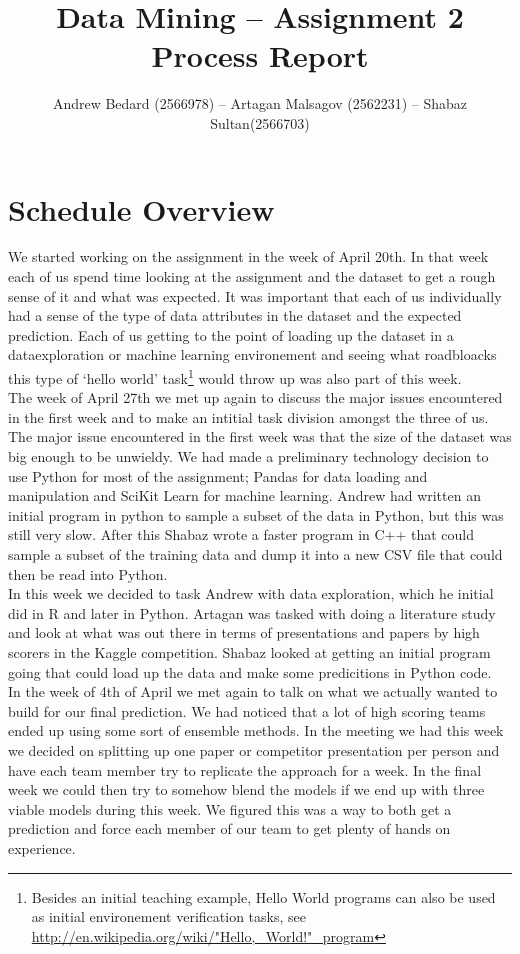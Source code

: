 \documentclass{llncs}
\title{Data Mining -- Assignment 2 Process Report}
\author{Andrew Bedard (2566978) -- Artagan Malsagov (2562231)  -- Shabaz Sultan(2566703)}
\institute{}
\begin{document}
\maketitle
\section{Schedule Overview}
We started working on the assignment in the week of April 20th. In that week each of us spend time looking at the assignment and the dataset to get a rough sense of it and what was expected. It was important that each of us individually had a sense of the type of data attributes in the dataset and the expected prediction. Each of us getting to the point of loading up the dataset in a dataexploration or machine learning environement and seeing what roadbloacks this type of `hello world' task\footnote{Besides an initial teaching example, Hello World programs can also be used as initial environement verification tasks, see \url{http://en.wikipedia.org/wiki/"Hello,_World!"_program}} would throw up was also part of this week.\\
The week of April 27th we met up again to discuss the major issues encountered in the first week and to make an intitial task division amongst the three of us. The major issue encountered in the first week was that the size of the dataset was big enough to be unwieldy. We had made a preliminary technology decision to use Python for most of the assignment; Pandas for data loading and manipulation and SciKit Learn for machine learning. Andrew had written an initial program in python to sample a subset of the data in Python, but this was still very slow. After this Shabaz wrote a faster program in C++ that could sample a subset of the training data and dump it into a new CSV file that could then be read into Python.\\
In this week we decided to task Andrew with data exploration, which he initial did in R and later in Python. Artagan was tasked with doing a literature study and look at what was out there in terms of presentations and papers by high scorers in the Kaggle competition. Shabaz looked at getting an initial program going that could load up the data and make some predicitions in Python code.\\
In the week of 4th of April we met again to talk on what we actually wanted to build for our final prediction. We had noticed that a lot of high scoring teams ended up using some sort of ensemble methods. In the meeting we had this week we decided on splitting up one paper or competitor presentation per person and have each team member try to replicate the approach for a week. In the final week we could then try to somehow blend the models if we end up with three viable models during this week. We figured this was a way to both get a prediction and force each member of our team to get plenty of hands on experience.\\
\end{document}
